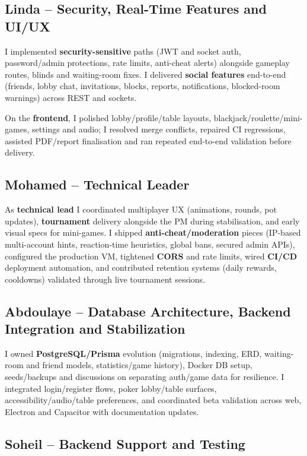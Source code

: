 \documentclass[11pt,a4paper]{article}
\begin{document}
\subsection{Linda -- Security, Real-Time Features and UI/UX}

I implemented \textbf{security-sensitive} paths (JWT and socket auth, password/admin protections, rate limits, anti-cheat alerts) alongside gameplay routes, blinds and waiting-room fixes. I delivered \textbf{social features} end-to-end (friends, lobby chat, invitations, blocks, reports, notifications, blocked-room warnings) across REST and sockets.

On the \textbf{frontend}, I polished lobby/profile/table layouts, blackjack/roulette/mini-games, settings and audio; I resolved merge conflicts, repaired CI regressions, assisted PDF/report finalisation and ran repeated end-to-end validation before delivery.

\subsection{Mohamed -- Technical Leader}

As \textbf{technical lead} I coordinated multiplayer UX (animations, rounds, pot updates), \textbf{tournament} delivery alongside the PM during stabilisation, and early visual specs for mini-games. I shipped \textbf{anti-cheat/moderation} pieces (IP-based multi-account hints, reaction-time heuristics, global bans, secured admin APIs), configured the production VM, tightened \textbf{CORS} and rate limits, wired \textbf{CI/CD} deployment automation, and contributed retention systems (daily rewards, cooldowns) validated through live tournament sessions.

\subsection{Abdoulaye -- Database Architecture, Backend Integration and Stabilization}

I owned \textbf{PostgreSQL/Prisma} evolution (migrations, indexing, ERD, waiting-room and friend models, statistics/game history), Docker DB setup, seeds/backups and discussions on separating auth/game data for resilience. I integrated login/register flows, poker lobby/table surfaces, accessibility/audio/table preferences, and coordinated beta validation across web, Electron and Capacitor with documentation updates.

\subsection{Soheil -- Backend Support and Testing}
\end{document}
